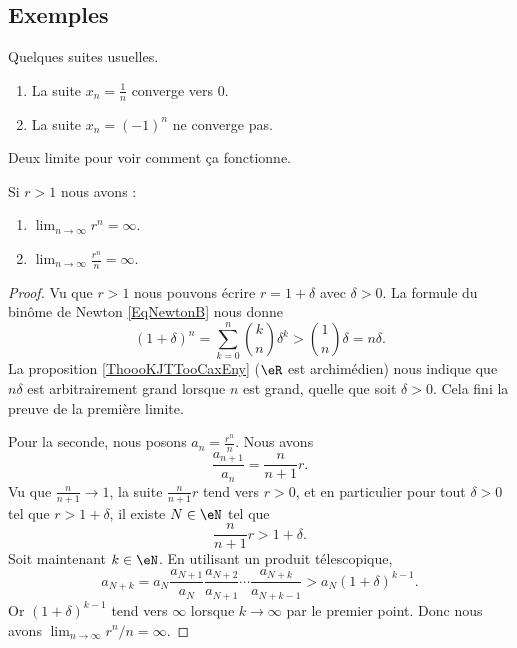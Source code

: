 \subsection{Exemples}

\begin{example}
	Quelques suites usuelles.
	\begin{enumerate}
		\item
			La suite $x_n=\frac{1}{ n }$ converge vers $0$.
		\item
			La suite $x_n=(-1)^n$ ne converge pas.
	\end{enumerate}
\end{example}

Deux limite pour voir comment ça fonctionne.
\begin{lemma}
    Si \( r>1\) nous avons :
    \begin{enumerate}
        \item
            \( \lim_{n\to \infty} r^n=\infty\).
        \item
            \( \lim_{n\to \infty} \frac{ r^n }{ n }=\infty\).
    \end{enumerate}
\end{lemma}

\begin{proof}
    Vu que \( r>1\) nous pouvons écrire \( r=1+\delta\) avec \( \delta>0\). La formule du binôme de Newton \eqref{EqNewtonB} nous donne
    \begin{equation}
        (1+\delta)^n=\sum_{k=0}^n{k\choose n}\delta^k>{1\choose n}\delta=n\delta.
    \end{equation}
    La proposition \ref{ThoooKJTTooCaxEny} (\( \eR\) est archimédien) nous indique que \( n\delta\) est arbitrairement grand lorsque \( n\) est grand, quelle que soit \( \delta>0\). Cela fini la preuve de la première limite.

    Pour la seconde, nous posons \( a_n=\frac{ r^n }{ n }\). Nous avons
    \begin{equation}
        \frac{ a_{n+1} }{ a_n }=\frac{ n }{ n+1 }r.
    \end{equation}
    Vu que \( \frac{ n }{ n+1 }\to 1\), la suite \( \frac{ n }{ n+1 }r\) tend vers \( r>0\), et en particulier pour tout \( \delta>0\) tel que \( r>1+\delta\), il existe \( N\in \eN\) tel que
    \begin{equation}
        \frac{ n }{ n+1 }r>1+\delta.
    \end{equation}
    Soit maintenant \( k\in \eN\). En utilisant un produit télescopique,
    \begin{equation}
        a_{N+k}=a_N\frac{ a_{N+1} }{ a_N }\frac{ a_{N+2} }{ a_{N+1} }\cdots\frac{ a_{N+k} }{ a_{N+k-1} }>a_N(1+\delta)^{k-1}.
    \end{equation}
    Or \( (1+\delta)^{k-1}\) tend vers \( \infty\) lorsque \( k\to \infty\) par le premier point. Donc nous avons \( \lim_{n\to \infty} r^n/n=\infty\).
\end{proof}


